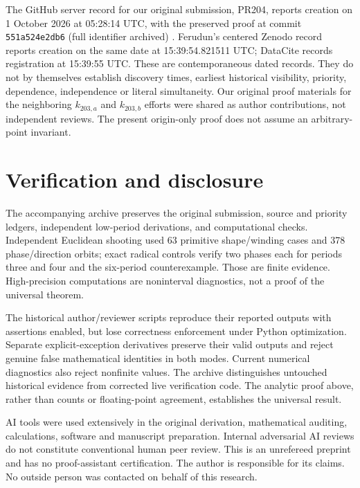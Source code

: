 \documentclass[11pt]{article}
\begin{document}
The GitHub server record for our original submission, PR204, reports
creation on 1 October 2026 at 05:28:14 UTC, with the preserved proof
at commit \texttt{551a524e2db6} (full identifier archived) \cite{PR204}.
Ferudun's centered Zenodo record reports creation on the same date at
15:39:54.821511 UTC; DataCite records registration at 15:39:55 UTC.
These are contemporaneous dated records. They do not by themselves
establish discovery times, earliest historical visibility, priority,
dependence, independence or literal simultaneity. Our original proof
materials for the neighboring $k_{203,a}$ and $k_{203,b}$ efforts were
shared as author contributions, not independent reviews. The present
origin-only proof does not assume an arbitrary-point invariant.

\section{Verification and disclosure}
The accompanying archive preserves the original submission, source and
priority ledgers, independent low-period derivations, and computational
checks. Independent Euclidean shooting used 63 primitive shape/winding
cases and 378 phase/direction orbits; exact radical controls verify two
phases each for periods three and four and the six-period counterexample.
Those are finite evidence. High-precision computations are noninterval
diagnostics, not a proof of the universal theorem.

The historical author/reviewer scripts reproduce their reported outputs
with assertions enabled, but lose correctness enforcement under Python
optimization. Separate explicit-exception derivatives preserve their
valid outputs and reject genuine false mathematical identities in both
modes. Current numerical diagnostics also reject nonfinite values.
The archive distinguishes untouched historical evidence from corrected
live verification code. The analytic proof above, rather than counts or
floating-point agreement, establishes the universal result.

AI tools were used extensively in the original derivation, mathematical
auditing, calculations, software and manuscript preparation. Internal
adversarial AI reviews do not constitute conventional human peer review.
This is an unrefereed preprint and has no proof-assistant certification.
The author is responsible for its claims. No outside person was contacted
on behalf of this research.
\end{document}
